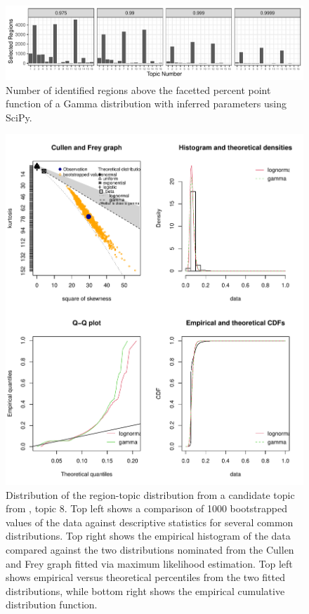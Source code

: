 \begin{figure}
  \centering
  \includegraphics[width=\textwidth]{plot/ch4/ludwig_topics_gamma_16.pdf}
  \caption{Number of identified regions above the facetted percent point function of a Gamma distribution with inferred parameters using SciPy.}
  \label{fig:ludwig_topics_gamma}
\end{figure}

\begin{figure}
  \centering
  \includegraphics[width=\textwidth]{plot/ch4/topic8_distribution.pdf}
  \caption{Distribution of the region-topic distribution from a candidate topic from , topic 8. Top left shows a comparison of 1000 bootstrapped values of the data against descriptive statistics for several common distributions. Top right shows the empirical histogram of the data compared against the two distributions nominated from the Cullen and Frey graph fitted via maximum likelihood estimation. Top left shows empirical versus theoretical percentiles from the two fitted distributions, while bottom right shows the empirical cumulative distribution function.}
  \label{fig:ludwig_topic8_distr}
\end{figure}

